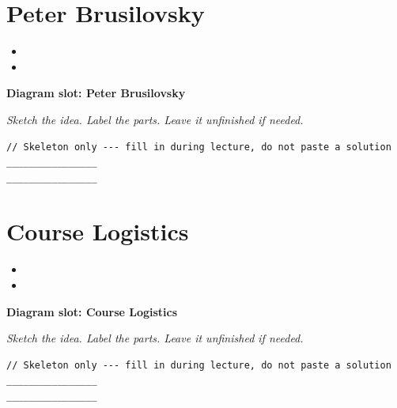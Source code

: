 \documentclass[11pt]{article}
\begin{document}
\section{Peter Brusilovsky}
\begin{itemize}[leftmargin=*]
  \item \hrulefill
  \vspace{2.4em}
  \item \hrulefill
  \vspace{2.4em}
\end{itemize}
\noindent\textbf{Diagram slot: Peter Brusilovsky}
\begin{framed}
\begin{minipage}[t][0.22\textheight]{\textwidth}
\vspace{0.4em}
\textit{Sketch the idea. Label the parts. Leave it unfinished if needed.}
\end{minipage}
\end{framed}
\vspace{1em}
\begin{lstlisting}
// Skeleton only --- fill in during lecture, do not paste a solution
________________
________________
\end{lstlisting}
\vspace{1em}
\section{Course Logistics}
\begin{itemize}[leftmargin=*]
  \item \hrulefill
  \vspace{2.4em}
  \item \hrulefill
  \vspace{2.4em}
\end{itemize}
\noindent\textbf{Diagram slot: Course Logistics}
\begin{framed}
\begin{minipage}[t][0.22\textheight]{\textwidth}
\vspace{0.4em}
\textit{Sketch the idea. Label the parts. Leave it unfinished if needed.}
\end{minipage}
\end{framed}
\vspace{1em}
\begin{lstlisting}
// Skeleton only --- fill in during lecture, do not paste a solution
________________
________________
\end{lstlisting}
\vspace{1em}
\end{document}
